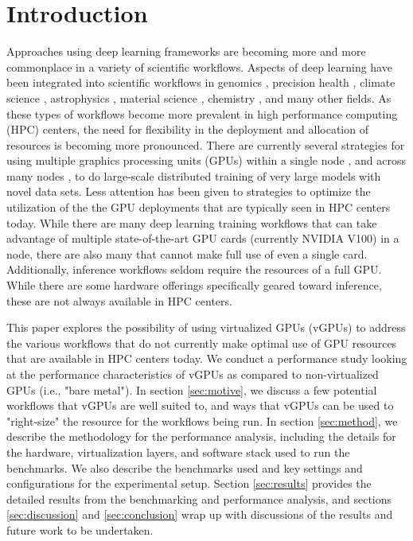 \documentclass[acmtog, authorversion]{acmart}
\begin{document}


%
\maketitle

\section{Introduction}
Approaches using deep learning frameworks are becoming more and more commonplace in a variety of scientific workflows. Aspects of deep learning have been integrated into scientific workflows in genomics \cite{genomics}, precision health \cite{prec-health}, climate science \cite{climate}, astrophysics \cite{astro}, material science \cite{material-science}, chemistry \cite{chemistry}, and many other fields. As these types of workflows become more prevalent in high performance computing (HPC) centers, the need for flexibility in the deployment and allocation of resources is becoming more pronounced. There are currently several strategies for using multiple graphics processing units (GPUs) within a single node \cite{mg-sn-1, mg-sn-2}, and across many nodes \cite{mg-mn-1, mg-mn-2}, to do large-scale distributed training of very large models with novel data sets. Less attention has been given to strategies to optimize the utilization of the the GPU deployments that are typically seen in HPC centers today. While there are many deep learning training workflows that can take advantage of multiple state-of-the-art GPU cards (currently NVIDIA V100) in a node, there are also many that cannot make full use of even a single card. Additionally, inference workflows seldom require the resources of a full GPU. While there are some hardware offerings specifically geared toward inference, these are not always available in HPC centers.

This paper explores the possibility of using virtualized GPUs (vGPUs) to address the various workflows that do not currently make optimal use of GPU resources that are available in HPC centers today. We conduct a performance study looking at the performance characteristics of vGPUs as compared to non-virtualized GPUs (i.e., "bare metal"). In section \ref{sec:motive}, we discuss a few potential workflows that vGPUs are well suited to, and ways that vGPUs can be used to "right-size" the resource for the workflows being run. In section \ref{sec:method}, we describe the methodology for the performance analysis, including the details for the hardware, virtualization layers, and software stack used to run the benchmarks. We also describe the benchmarks used and key settings and configurations for the experimental setup. Section \ref{sec:results} provides the detailed results from the benchmarking and performance analysis, and sections \ref{sec:discussion} and \ref{sec:conclusion} wrap up with discussions of the results and future work to be undertaken.
\end{document}
